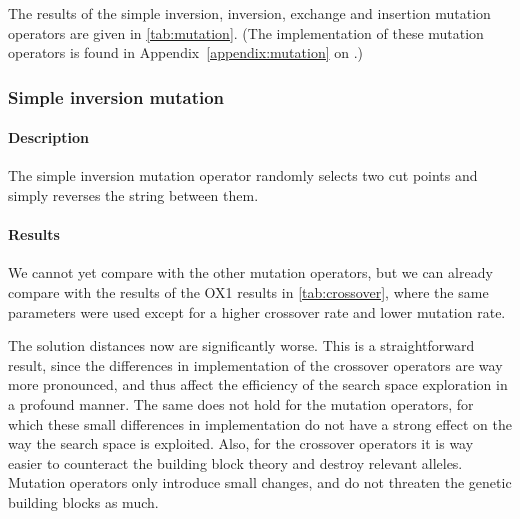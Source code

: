 \documentclass[a4paper,english,11pt,]{scrartcl}
\begin{document}
The results of the simple inversion, inversion, exchange and insertion mutation operators are given in \autoref{tab:mutation}.
(The implementation of these mutation operators is found in Appendix~\ref{appendix:mutation} on .)
% 



\subsubsection{Simple inversion mutation}
\paragraph{Description}

% 

The simple inversion mutation operator randomly selects two cut points and simply reverses the string between them.

\paragraph{Results}
We cannot yet compare with the other mutation operators, but we can already compare with the results of the OX1 results in \autoref{tab:crossover}, where the same parameters were used except for a higher crossover rate and lower mutation rate.   

The solution distances now are significantly worse. This is a straightforward result, since the differences in implementation of the crossover operators are way more pronounced, and thus affect the efficiency of the search space exploration in a profound manner. The same does not hold for the mutation operators, for which these small differences in implementation do not have a strong effect on the way the search space is exploited. Also, for the crossover operators it is way easier to counteract the building block theory and destroy relevant alleles. Mutation operators only introduce small changes, and do not threaten the genetic building blocks as much.    
\end{document}
